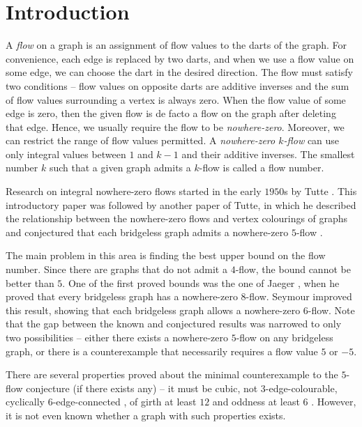 \chapter*{Introduction} %

A \emph{flow} on a graph is an assignment of flow values to the darts of the graph. For convenience, each edge is replaced by two darts, and when we use a flow value on some edge, we can choose the dart in the desired direction. The flow must satisfy two conditions -- flow values on opposite darts are additive inverses and the sum of flow values surrounding a vertex is always zero. When the flow value of some edge is zero, then the given flow is de facto a flow on the graph after deleting that edge. Hence, we usually require the flow to be \emph{nowhere-zero}. Moreover, we can restrict the range of flow values permitted. A \emph{nowhere-zero $k$-flow} can use only integral values between $1$ and $k-1$ and their additive inverses. The smallest number $k$ such that a given graph admits a $k$-flow is called a flow number.

Research on integral nowhere-zero flows started in the early $1950$s by Tutte \cite{tutte_beginning}. This introductory paper was followed by another paper of Tutte, in which he described the relationship between the nowhere-zero flows and vertex colourings of graphs and conjectured that each bridgeless graph admits a nowhere-zero $5$-flow \cite{tutte}.

The main problem in this area is finding the best upper bound on the flow number. Since there are graphs that do not admit a $4$-flow, the bound cannot be better than $5$. One of the first proved bounds was the one of Jaeger \cite{jaeger1979flows}, when he proved that every bridgeless graph has a nowhere-zero $8$-flow. Seymour \cite{seymour} improved this result, showing that each bridgeless graph allows a nowhere-zero $6$-flow. Note that the gap between the known and conjectured results was narrowed to only two possibilities -- either there exists a nowhere-zero $5$-flow on any bridgeless graph, or there is a counterexample that necessarily requires a flow value $5$ or $-5$.

There are several properties proved about the minimal counterexample to the $5$-flow conjecture (if there exists any) -- it must be cubic, not $3$-edge-colourable, cyclically $6$-edge-connected \cite{min_ctrex_cyc_edge_con}, of girth at least $12$ \cite{min_ctrex_girth} and oddness at least $6$ \cite{oddness_4}. However, it is not even known whether a graph with such properties exists.

